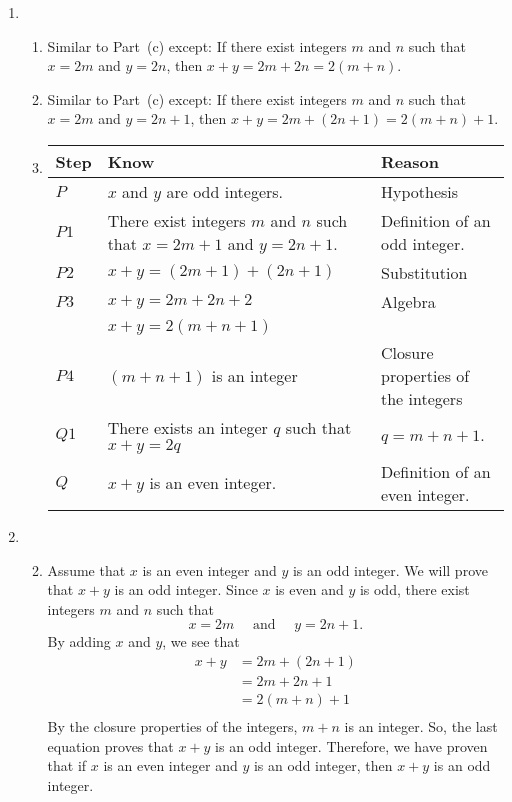 \begin{enumerate}
\item \begin{enumerate}  
\item Similar to Part~(c) except:  If there exist integers $m$ and $n$ such that $x = 2m$ and 
$y = 2n$, then $x + y = 2m + 2n = 2 \left(m + n \right)$. 

\item Similar to Part~(c) except:  If there exist integers $m$ and $n$ such that $x = 2m$ and 
$y = 2n+1$, then $x + y = 2m + \left(2n + 1 \right) = 2 \left(m + n \right) + 1$. 

\item \begin{tabular}[t]{|p{0.4in}|p{1.6in}|p{1.6in}|}
  \hline
  \textbf{Step}  &  \textbf{Know}  &  \textbf{Reason} \\ \hline
  $P$  &  $x$ and $y$ are odd integers.  &  Hypothesis \\ \hline
  $P1$ &  There exist integers $m$ and $n$ such that $x = 2m+1$ and $y = 2n+1$.  &  Definition of an odd integer. \\ \hline
  $P2$  &  $x + y = \left( 2m+1 \right) + \left( 2n+1 \right)$  &  Substitution \\ \hline
  $P3$  &  $x + y = 2m + 2n + 2$  &  Algebra  \\
        &  $x + y = 2 \left( {m+n+1} \right)$  &  \\ \hline
  $P4$  &  $\left( {m+n+1} \right)$ is an integer  &  Closure properties of the integers \\ \hline
  $Q1$  &  There exists an integer $q$ such that $x + y = 2q$  & $q = m+n+1$.  \\ \hline
  $Q$  &  $x + y$ is an even integer. &  Definition of an even integer. \\ \hline
\end{tabular}
\end{enumerate}



\item \begin{enumerate} \setcounter{enumii}{1}
\item Assume that $x$ is an even integer and $y$ is an odd integer.  We will prove that $x + y$ is an odd integer.  Since $x$ is even and $y$ is odd, there exist integers $m$ and $n$ such that
\[
x = 2m \quad \text{ and } \quad y = 2n + 1.
\]
By adding $x$ and $y$, we see that
\[
\begin{aligned}
x + y &= 2m + \left( 2n + 1 \right) \\
      &= 2m + 2n + 1 \\
      &= 2 \left( m + n \right) + 1 \\
\end{aligned}
\]
By the closure properties of the integers, $m + n$ is an integer.  So, the last equation proves that $x + y$ is an odd integer.  Therefore, we have proven that if $x$ is an even integer and $y$ is an odd integer, then $x + y$ is an odd integer.
\end{enumerate}



\end{enumerate}
